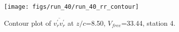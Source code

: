 \begin{figure}[H]
\centering
\texttt{[image: figs/run\_40/run\_40\_rr\_contour]}
\caption{Contour plot of $\overline{v_{r}^{\prime} v_{r}^{\prime}}$ at $z/c$=8.50, $V_{free}$=33.44, station 4.}
\label{fig:run_40_rr_contour}
\end{figure}


